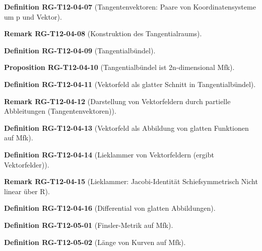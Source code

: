 \documentclass[10pt, letterpaper]{article}
\newcommand{\CustomHeading}[3]{%
  \par\medskip\noindent%
  \textbf{#1 #2} \textnormal{(#3)}.\enskip%
}
\newenvironment{DEF}[2]{\CustomHeading{Definition}{#1}{#2}}{}
\newenvironment{PROP}[2]{\CustomHeading{Proposition}{#1}{#2}}{}
\newenvironment{REM}[2]{\CustomHeading{Remark}{#1}{#2}}{}
\begin{document}
\begin{DEF}{RG-T12-04-07}{Tangentenvektoren: Paare von Koordinatensysteme um p und Vektor}
\end{DEF}

\begin{REM}{RG-T12-04-08}{Konstruktion des Tangentialraums}
\end{REM}

\begin{DEF}{RG-T12-04-09}{Tangentialbündel}
\end{DEF}

\begin{PROP}{RG-T12-04-10}{Tangentialbündel ist 2n-dimensional Mfk}
\end{PROP}

\begin{DEF}{RG-T12-04-11}{Vektorfeld als glatter Schnitt in Tangentialbündel}
\end{DEF}

\begin{REM}{RG-T12-04-12}{Darstellung von Vektorfeldern durch partielle Abbleitungen (Tangentenvektoren)}
\end{REM}

\begin{DEF}{RG-T12-04-13}{Vektorfeld als Abbildung von glatten Funktionen auf Mfk}
\end{DEF}

\begin{DEF}{RG-T12-04-14}{Lieklammer von Vektorfeldern (ergibt Vektorfelder)}
\end{DEF}

\begin{REM}{RG-T12-04-15}{Lieklammer:
Jacobi-Identität
Schiefsymmetrisch
Nicht linear über R}
\end{REM}

\begin{DEF}{RG-T12-04-16}{Differential von glatten Abbildungen}
\end{DEF}

\begin{DEF}{RG-T12-05-01}{Finsler-Metrik auf Mfk}
\end{DEF}

\begin{DEF}{RG-T12-05-02}{Länge von Kurven auf Mfk}
\end{DEF}
\end{document}
